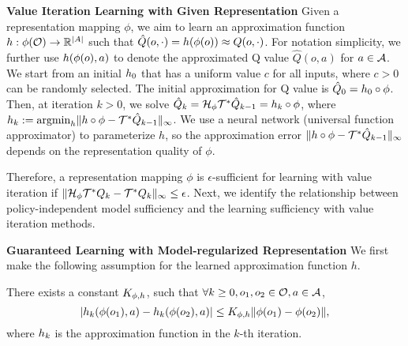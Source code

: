 \textbf{Value Iteration Learning with Given Representation}\quad
Given a representation mapping $\phi$, we aim to learn an approximation function $h:\phi(\mathcal{O})\to\mathbb{R}^{|A|}$ such that $\hat{Q}(o,\cdot)=h(\phi(o))\approx Q(o,\cdot)$. For notation simplicity, we further use $h(\phi(o),a)$ to denote the approximated Q value $\hat{Q}(o,a)$ for $a\in\mathcal{A}$.
We start from an initial $h_0$ that has a uniform value $c$ for all inputs, where $c>0$ can be randomly selected. The initial approximation for Q value is $\hat{Q}_0=h_0\circ\phi$.
Then, at iteration $k>0$, we solve $\hat{Q}_k=\mathcal{H}_{\phi}\mathcal{T}^*\hat{Q}_{k-1}=h_{k}\circ\phi$, where $h_k:=\mathrm{argmin}_h \| h\circ\phi - \mathcal{T}^*\hat{Q}_{k-1} \|_\infty$. We use a neural network (universal function approximator) to parameterize $h$, so the approximation error $\| h\circ\phi - \mathcal{T}^*\hat{Q}_{k-1} \|_\infty$ depends on the representation quality of $\phi$.

Therefore, a representation mapping $\phi$ is $\epsilon$-sufficient for learning with value iteration if $\|\mathcal{H}_{\phi}\mathcal{T}^* Q_k - \mathcal{T}^* Q_k\|_\infty\leq \epsilon$. 
Next, we identify the relationship between policy-independent model sufficiency and the learning sufficiency with value iteration methods.

\textbf{Guaranteed Learning with Model-regularized Representation}\quad
We first make the following assumption for the learned approximation function $h$.
\begin{assumption}
\label{assump:lips_appro}
There exists a constant $K_{\phi,h}$, such that $\forall k\geq 0, o_1,o_2\in\mathcal{O}, a\in\mathcal{A}$, 
\begin{equation}
    | h_k(\phi(o_1),a) - h_k(\phi(o_2),a) | \leq K_{\phi,h} \| \phi(o_1) - \phi(o_2) \|,
\end{equation}
where $h_k$ is the approximation function in the $k$-th iteration.
\end{assumption}

